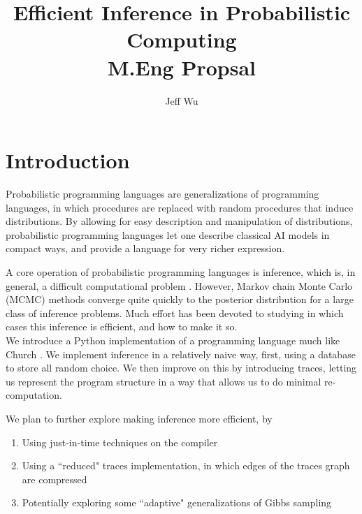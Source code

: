 \documentclass[11pt]{article}
\begin{document}
\title{{\bf Efficient Inference in Probabilistic Computing} \\ M.Eng Propsal}
\author{Jeff Wu}
\date{}
\maketitle
%





\section{Introduction}

Probabilistic programming languages are generalizations of programming languages, in which procedures are replaced with random procedures that induce distributions.  By allowing for easy description and manipulation of distributions, probabilistic programming languages let one describe classical AI models in compact ways, and provide a language for very richer expression.  

A core operation of probabilistic programming languages is inference, which is, in general, a difficult computational problem \cite{?}.  However, Markov chain Monte Carlo (MCMC) methods converge quite quickly to the posterior distribution for a large class of inference problems.  Much effort has been devoted to studying in which cases this inference is efficient, and how to make it so.  \\

We introduce a Python implementation of a programming language much like Church \cite{?}.  We implement inference in a relatively naive way, first, using a database to store all random choice.  We then improve on this by introducing traces, letting us represent the program structure in a way that allows us to do minimal re-computation.  

We plan to further explore making inference more efficient, by
\begin{enumerate}
\item Using just-in-time techniques on the compiler
\item Using a ``reduced" traces implementation, in which edges of the traces graph are compressed
\item Potentially exploring some ``adaptive" generalizations of Gibbs sampling
\end{enumerate}
\end{document}
